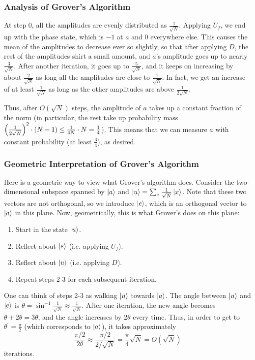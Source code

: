 \subsubsection{Analysis of Grover's Algorithm}

At step 0, all the amplitudes are evenly distributed as $\frac{1}{\sqrt{N}}$. Applying $U_f$, we end up with the phase state,
which is $-1$ at $a$ and 0 everywhere else. This causes the mean of the amplitudes to decrease ever so slightly, so that after applying $D$, the rest of the amplitudes shirt a small amount, and $a$'s amplitude goes up to nearly $\frac{3}{\sqrt{N}}$.
After another iteration, it goes up to $\frac{5}{\sqrt{N}}$, and it keeps on increasing by about $\frac{2}{\sqrt{N}}$
as long all the amplitudes are close to $\frac{1}{\sqrt{N}}$. In fact, we get an increase of at least $\frac{1}{\sqrt{N}}$ as long as the other amplitudes are above $\frac{1}{2\sqrt{N}}$. 

Thus, after $O(\sqrt{N})$
steps, the amplitude of $a$ takes up a constant fraction of the norm (in particular, the rest take up 
probability mass $\qty(\frac{1}{2\sqrt{N}})^2 \cdot (N - 1) \leq \frac{1}{4N} \cdot N = \frac{1}{4}$).
This means that we can measure $a$ with constant probability (at least $\frac{3}{4}$), as desired.

\subsubsection{Geometric Interpretation of Grover's Algorithm}
Here is a geometric way to view what Grover's algorithm does. Consider the two-dimensional subspace spanned by
$\ket{a}$ and $\ket{u} = \sum_x \frac{1}{\sqrt{N}} \ket{x}$. Note that these two vectors are not orthogonal, so we introduce $\ket e$, which is an orthogonal
vector to $\ket{a}$ in this plane. Now, geometrically, this is what Grover's does on this plane:
\begin{enumerate}
    \item Start in the state $\ket u$.
    \item Reflect about $\ket e$ (i.e. applying $U_f$).
    \item Reflect about $\ket u$ (i.e. applying $D$).
    \item Repeat steps 2-3 for each subsequent iteration.
\end{enumerate}
One can think of steps 2-3 as walking $\ket{u}$ towards $\ket{a}$. The angle between $\ket{u}$ and $\ket{e}$ is $\theta = \sin^{-1} \frac{1}{\sqrt{N}} \approx \frac{1}{\sqrt{N}}$.
After one iteration, the new angle becomes $\theta + 2 \theta = 3 \theta$, and the angle increases by $2\theta$ every time. Thus, in order to get to $\theta^{\prime} = \frac{\pi}{2}$ (which corresponds to $\ket a$), it takes approximately
\[\frac{\pi /2}{2 \theta} \approx \frac{\pi / 2}{2 / \sqrt{N}} = \frac{\pi}{4} \sqrt{N} = O(\sqrt{N})\]
iterations. 

